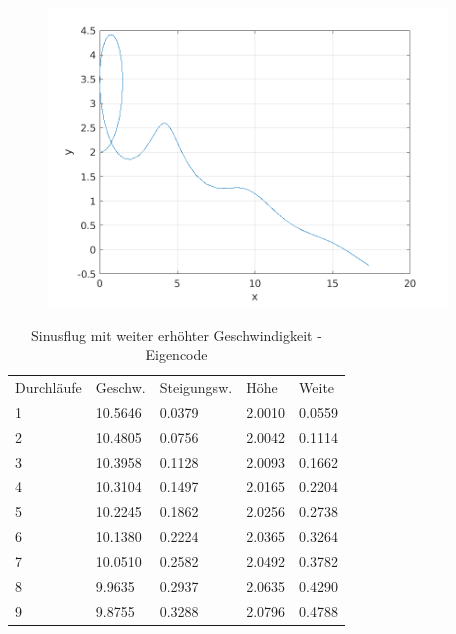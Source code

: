 \documentclass[a4paper,12pt]{scrartcl}
\begin{document}
\begin{figure}[htp]
	\centering
	\includegraphics[width=300pt]{flightpath4.png}
	\label{fig:sin3}
\end{figure}
\begin{table}
\centering
\caption{Sinusflug mit weiter erhöhter Geschwindigkeit -  Eigencode}
\begin{tabular}{lllll}
Durchläufe & Geschw. & Steigungsw. & Höhe   & Weite   \\
1          & 10.5646 & 0.0379      & 2.0010 & 0.0559  \\
2          & 10.4805 & 0.0756      & 2.0042 & 0.1114  \\
3          & 10.3958 & 0.1128      & 2.0093 & 0.1662  \\
4          & 10.3104 & 0.1497      & 2.0165 & 0.2204  \\
5          & 10.2245 & 0.1862      & 2.0256 & 0.2738  \\
6          & 10.1380 & 0.2224      & 2.0365 & 0.3264  \\
7          & 10.0510 & 0.2582      & 2.0492 & 0.3782  \\
8          & 9.9635  & 0.2937      & 2.0635 & 0.4290  \\
9          & 9.8755  & 0.3288      & 2.0796 & 0.4788 
\end{tabular}
\end{table}
\end{document}
